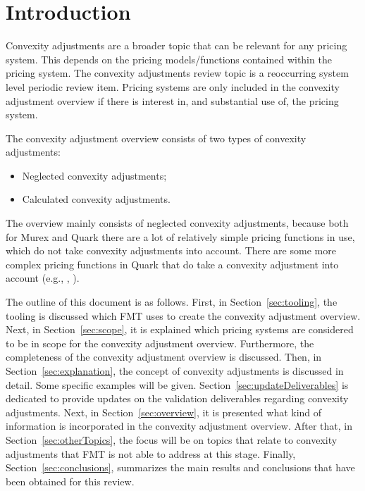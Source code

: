 \documentclass[reviewdoc]{pmv_report} %
\begin{document}
\makecoverpage

\section{Introduction}
\label{sec:intro}
\cintroParI

\cintroParIII

\cintroParIV

\cintroParV

\cintroParVI

Convexity adjustments are a broader topic that can be relevant for any pricing system.
This depends on the pricing models/functions contained within the pricing system.
The convexity adjustments review topic is a reoccurring system level periodic review item.
Pricing systems are only included in the convexity adjustment overview if there is interest in, and substantial use of, the pricing system.

The convexity adjustment overview consists of two types of convexity adjustments:
\begin{itemize}
  \item Neglected convexity adjustments;
  \item Calculated convexity adjustments.
\end{itemize}
The overview mainly consists of neglected convexity adjustments, because both for Murex and Quark there are a lot of relatively simple pricing functions in use, which do not take convexity adjustments into account.
There are some more complex pricing functions in Quark that do take a convexity adjustment into account (e.g., , ).

The outline of this document is as follows.
First, in Section~\ref{sec:tooling}, the tooling is discussed which FMT uses to create the convexity adjustment overview.
Next, in Section~\ref{sec:scope}, it is explained which pricing systems are considered to be in scope for the convexity adjustment overview.
Furthermore, the completeness of the convexity adjustment overview is discussed.
Then, in Section~\ref{sec:explanation}, the concept of convexity adjustments is discussed in detail.
Some specific examples will be given.
Section~\ref{sec:updateDeliverables} is dedicated to provide updates on the validation deliverables regarding convexity adjustments.
Next, in Section~\ref{sec:overview}, it is presented what kind of information is incorporated in the convexity adjustment overview.
After that, in Section~\ref{sec:otherTopics}, the focus will be on topics that relate to convexity adjustments that FMT is not able to address at this stage.
Finally, Section~\ref{sec:conclusions}, summarizes the main results and conclusions that have been obtained for this review.
\end{document}
